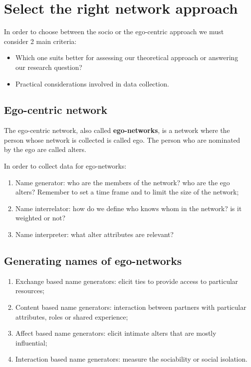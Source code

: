 \documentclass[
  notitlepage,
  onecolumn,
  openany]{book}
\providecommand{\tightlist}{%
  \setlength{\itemsep}{0pt}\setlength{\parskip}{0pt}}
\begin{document}
\hypertarget{select-the-right-network-approach}{%
\section{Select the right network approach}\label{select-the-right-network-approach}}

In order to choose between the socio or the ego-centric approach we must consider 2 main criteria:

\begin{itemize}
\tightlist
\item
  Which one suits better for assessing our theoretical approach or answering our research question?
\item
  Practical considerations involved in data collection.
\end{itemize}

\hypertarget{ego-centric-network}{%
\subsection{Ego-centric network}\label{ego-centric-network}}

The ego-centric network, also called \textbf{ego-networks}, is a network where the person whose network is collected is called ego. The person who are nominated by the ego are called alters.

In order to collect data for ego-networks:

\begin{enumerate}
\def\labelenumi{\arabic{enumi}.}
\tightlist
\item
  Name generator: who are the members of the network? who are the ego alters? Remember to set a time frame and to limit the size of the network;
\item
  Name interrelator: how do we define who knows whom in the network? is it weighted or not?
\item
  Name interpreter: what alter attributes are relevant?
\end{enumerate}

\hypertarget{generating-names-of-ego-networks}{%
\subsection{Generating names of ego-networks}\label{generating-names-of-ego-networks}}

\begin{enumerate}
\def\labelenumi{\arabic{enumi}.}
\tightlist
\item
  Exchange based name generators: elicit ties to provide access to particular resources;
\item
  Content based name generators: interaction between partners with particular attributes, roles or shared experience;
\item
  Affect based name generators: elicit intimate alters that are mostly influential;
\item
  Interaction based name generators: measure the sociability or social isolation.
\end{enumerate}
\end{document}
